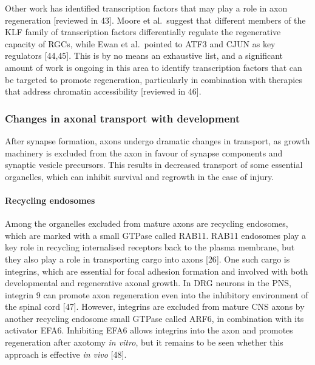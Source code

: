 \documentclass[
  12pt,
  a4paper,
]{book}
\begin{document}
Other work has identified transcription factors that may play a role in axon regeneration {[}reviewed in 43{]}. Moore et al.~suggest that different members of the KLF family of transcription factors differentially regulate the regenerative capacity of RGCs, while Ewan et al.~pointed to ATF3 and CJUN as key regulators {[}44,45{]}. This is by no means an exhaustive list, and a significant amount of work is ongoing in this area to identify transcription factors that can be targeted to promote regeneration, particularly in combination with therapies that address chromatin accessibility {[}reviewed in 46{]}.

\hypertarget{changes-in-axonal-transport-with-development}{%
\subsubsection{Changes in axonal transport with development}\label{changes-in-axonal-transport-with-development}}

After synapse formation, axons undergo dramatic changes in transport, as growth machinery is excluded from the axon in favour of synapse components and synaptic vesicle precursors. This results in decreased transport of some essential organelles, which can inhibit survival and regrowth in the case of injury.

\hypertarget{recycling-endosomes}{%
\paragraph{Recycling endosomes}\label{recycling-endosomes}}

Among the organelles excluded from mature axons are recycling endosomes, which are marked with a small GTPase called RAB11. RAB11 endosomes play a key role in recycling internalised receptors back to the plasma membrane, but they also play a role in transporting cargo into axons {[}26{]}. One such cargo is integrins, which are essential for focal adhesion formation and involved with both developmental and regenerative axonal growth. In DRG neurons in the PNS, integrin \textalpha{}9 can promote axon regeneration even into the inhibitory environment of the spinal cord {[}47{]}. However, integrins are excluded from mature CNS axons by another recycling endosome small GTPase called ARF6, in combination with its activator EFA6. Inhibiting EFA6 allows integrins into the axon and promotes regeneration after axotomy \emph{in vitro}, but it remains to be seen whether this approach is effective \emph{in vivo} {[}48{]}.
\end{document}
